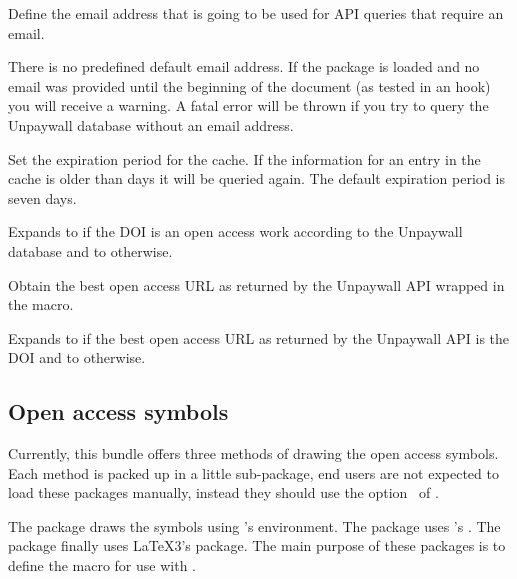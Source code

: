 \documentclass[DIV=9]{scrartcl}
\begin{document}
\begin{ltxsyntax}

Define the email address that is going to be used for API queries that require
an email.

\begin{warnbox}
There is no predefined default email address.
If the package is loaded and no email was provided until the
beginning of the document (as tested in an  hook)
you will receive a warning.
A fatal error will be thrown if you try to query the Unpaywall database
without an email address.
\end{warnbox}


Set the expiration period for the cache.
If the information for an entry in the cache is older than  days
it will be queried again.
The default expiration period is seven days.


Expands to  if the DOI is an open access work according to the
Unpaywall database and to  otherwise.


Obtain the best open access URL as returned by the Unpaywall API wrapped in
the  macro.


Expands to  if the best open access URL as returned by the Unpaywall
API is the DOI and to  otherwise.
\end{ltxsyntax}


\subsection{Open access symbols}\label{sec:oa:symbol}
Currently, this bundle offers three methods of drawing the open access
symbols.
Each method is packed up in a little sub-package, end users are not
expected to load these packages manually, instead they should use
the option~ of .

The package  draws the symbols using
's  environment.
The package 
uses \pgftikz's .
The package  finally
uses \LaTeX3's  package.
The main purpose of these packages is to define the macro 
for use with .
\end{document}
